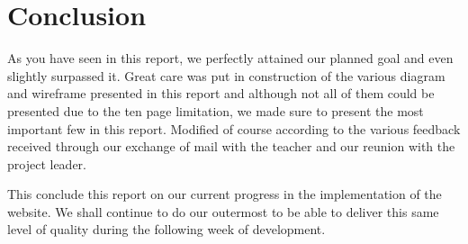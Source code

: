 \section{Conclusion}

As you have seen in this report, we perfectly attained our planned goal and even slightly surpassed it. Great care was put in construction of the various diagram and wireframe presented in this report and although not all of them could be presented due to the ten page limitation, we made sure to present the most important few in this report. Modified of course according to the various feedback received through our exchange of mail with the teacher and our reunion with the project leader. \newline

This conclude this report on our current progress in the implementation of the website. We shall continue to do our outermost to be able to deliver this same level of quality during the following week of development. 